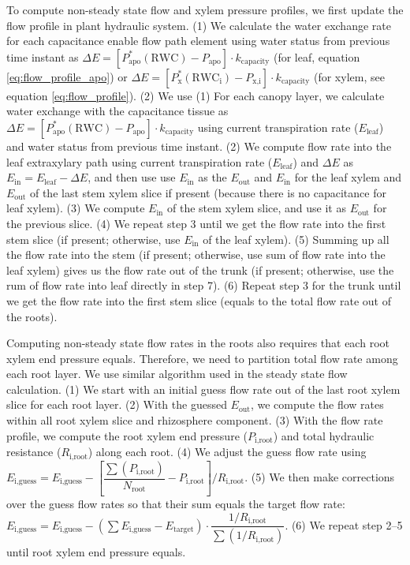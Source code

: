 \documentclass[twoside,10pt]{report}
\begin{document}
\par To compute non-steady state flow and xylem pressure profiles, we first update the flow profile in plant hydraulic system. (1) We calculate the water exchange rate for each capacitance enable flow path element using water status from previous time instant as $\Delta E = \left[ P_\text{apo}^{*}(\text{RWC}) - P_\text{apo} \right] \cdot k_\text{capacity}$ (for leaf, equation \ref{eq:flow_profile_apo}) or $\Delta E = \left[ P_\text{x}^{*}(\text{RWC}_\text{i}) - P_\text{x,i} \right] \cdot k_\text{capacity}$ (for xylem, see equation \ref{eq:flow_profile}). (2) We use 
(1) For each canopy layer, we calculate water exchange with the capacitance tissue as $\Delta E = \left[ P_\text{apo}^{*}(\text{RWC}) - P_\text{apo} \right] \cdot k_\text{capacity}$ using current transpiration rate ($E_\text{leaf}$) and water status from previous time instant. (2) We compute flow rate into the leaf extraxylary path using current transpiration rate ($E_\text{leaf}$) and $\Delta E$ as $E_\text{in} = E_\text{leaf} - \Delta E$, and then use use $E_\text{in}$ as the $E_\text{out}$ and $E_\text{in}$ for the leaf xylem and $E_\text{out}$ of the last stem xylem slice if present (because there is no capacitance for leaf xylem). (3) We compute $E_\text{in}$ of the stem xylem slice, and use it as $E_\text{out}$ for the previous slice. (4) We repeat step 3 until we get the flow rate into the first stem slice (if present; otherwise, use $E_\text{in}$ of the leaf xylem). (5) Summing up all the flow rate into the stem (if present; otherwise, use sum of flow rate into the leaf xylem) gives us the flow rate out of the trunk (if present; otherwise, use the rum of flow rate into leaf directly in step 7). (6) Repeat step 3 for the trunk until we get the flow rate into the first stem slice (equals to the total flow rate out of the roots).

\par Computing non-steady state flow rates in the roots also requires that each root xylem end pressure equals. Therefore, we need to partition total flow rate among each root layer. We use similar algorithm used in the steady state flow calculation. (1) We start with an initial guess flow rate out of the last root xylem slice for each root layer. (2) With the guessed $E_\text{out}$, we compute the flow rates within all root xylem slice and rhizosphere component. (3) With the flow rate profile, we compute the root xylem end pressure ($P_\text{i,root}$) and total hydraulic resistance ($R_\text{i,root}$) along each root. (4) We adjust the guess flow rate using $E_\text{i,guess} = E_\text{i,guess} - \left[ \dfrac{\sum \left( P_\text{i,root} \right)}{N_\text{root}} - P_\text{i,root} \right] / R_\text{i,root}$. (5) We then make corrections over the guess flow rates so that their sum equals the target flow rate: $E_\text{i,guess} = E_\text{i,guess} - \left( \sum E_\text{i,guess} - E_\text{target} \right) \cdot \dfrac{1 / R_\text{i,root}}{\sum \left( 1 / R_\text{i,root} \right)}$. (6) We repeat step 2--5 until root xylem end pressure equals.
\end{document}

